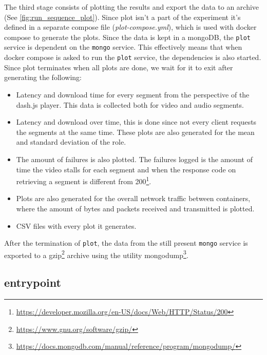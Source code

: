 

The third stage consists of plotting the results and export the data to an archive (See \autoref{fig:run_sequence_plot}). Since plot isn't a part of the experiment it's defined in a separate compose file (\textit{plot-compose.yml}), which is used with docker compose to generate the plots. Since the data is kept in a mongoDB, the \texttt{plot} service is dependent on the \texttt{mongo} service. This effectively means that when docker compose is asked to run the \texttt{plot} service, the dependencies is also started. Since plot terminates when all plots are done, we wait for it to exit after generating the following:

\begin{itemize}
    \item Latency and download time for every segment from the perspective of the dash.js player. This data is collected both for video and audio segments.
    \item Latency and download over time, this is done since not every client requests the segments at the same time. These plots are also generated for the mean and standard deviation of the role.
    \item The amount of failures is also plotted. The failures logged is the amount of time the video stalls for each segment  and when the response code on retrieving a segment is different from 200\footnote{\url{https://developer.mozilla.org/en-US/docs/Web/HTTP/Status/200}}.
    \item Plots are also generated for the overall network traffic between containers, where the amount of bytes and packets received and transmitted is plotted.
    \item \acs{CSV} files with every plot it generates.
\end{itemize}

After the termination of \texttt{plot}, the data from the still present \texttt{mongo} service is exported to a gzip\footnote{\url{https://www.gnu.org/software/gzip/}} archive using the utility mongodump\footnote{\url{https://docs.mongodb.com/manual/reference/program/mongodump/}}. 




\subsection{entrypoint}
\label{sec:experiment_entrypoint}

